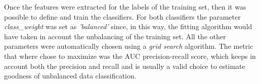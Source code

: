 \documentclass{standalone}
\begin{document}
Once the features were extracted for the labels of the training set, then it was possible to define and train the classifiers.
For both classifiers the parameter \textit{class\_weight} was set as \textit{'balanced'} since, in this way, the fitting algorithm would have taken in account the unbalancing of the training set.
All the other parameters were automatically chosen using a \emph{grid search} algorithm.
The metric that where chose to maximize was the AUC precision-recall score, which keeps in account both the precision and recall and is usually a valid choice to estimate goodness of unbalanced data classification.



\end{document}
